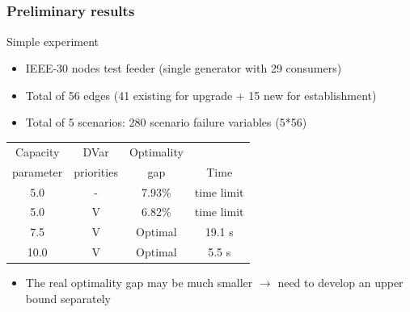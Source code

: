 \documentclass{beamer}
\begin{document}
\subsection{}
\begin{frame}
\frametitle{Preliminary results}
\footnotesize
Simple experiment
\begin{itemize}
	\item IEEE-30 nodes test feeder (single generator with 29 consumers)
	\item Total of 56 edges (41 existing for upgrade + 15 new for establishment)
	\item Total of 5 scenarios: 280 scenario failure variables (5*56)
\end{itemize}
\begin{table}
\centering
\begin{tabular}{cccc}\toprule
Capacity & DVar & Optimality & \\
parameter & priorities & gap & Time\\ \toprule
5.0 & - & 7.93\% & time limit\\
5.0 & V & 6.82\% & time limit\\
7.5 & V & Optimal & 19.1 s\\
10.0 & V & Optimal & 5.5 s\\\bottomrule
\end{tabular}
\end{table}
\begin{itemize}
	\item The real optimality gap may be much smaller $\rightarrow$ need to develop an upper bound separately
\end{itemize}
\end{frame}

%
%
%
\end{document}
